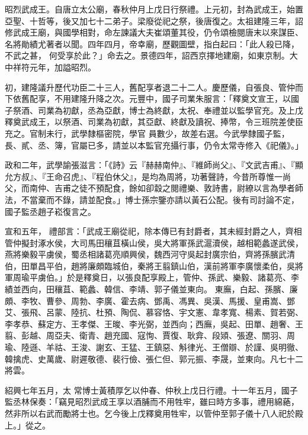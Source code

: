 \begin{pinyinscope}
 昭烈武成王。自唐立太公廟，春秋仲月上戊日行祭禮。上元初，封為武成王，始置亞聖、十哲等，後又加七十二弟子。梁廢從祀之祭，後唐復之。太祖建隆三年，詔修武成王廟，與國學相對，命左諫議大夫崔頌董其役，仍令頌檢閱唐末以來謀臣、名將勛績尤著者以聞。四年四月，帝幸廟，歷觀圖壁，指白起曰：「此人殺已降，不武之甚，
 何受享於此？」命去之。景德四年，詔西京擇地建廟，如東京制。大中祥符元年，加謚昭烈。



 初，建隆議升歷代功臣二十三人，舊配享者退二十二人。慶歷儀，自張良、管仲而下依舊配享，不用建隆升降之次。元豐中，國子司業朱服言：「釋奠文宣王，以國子祭酒、司業為初獻，丞為亞獻，博士為終獻，太祝、奉禮並以監學官充。及上戊釋奠武成王，以祭酒、司業為初獻，其亞獻、終獻及讀祝、捧幣，令三班院差使臣充之。官制未行，武學隸樞密院，學官
 員數少，故差右選。今武學隸國子監，長、貳、丞、簿，官屬已多，請並以本監官充攝行事，仍令太常寺修入《祀儀》。」



 政和二年，武學諭張滋言：「《詩》云『赫赫南仲』、『維師尚父』、『文武吉甫』、『顯允方叔』、『王命召虎』、『程伯休父』，是均為周將，功著聲詩，今昔所尊惟一尚父，而南仲、吉甫之徒不預配食，餘如卻縠之閱禮樂、敦詩書，尉繚以言為學者師法，不當棄而不錄，請並配食。」博士孫宗鑒亦請以黃石公配。後有司討論不定，國子監丞趙子崧復言之。



 宣和五年，
 禮部言：「武成王廟從祀，除本傳已有封爵者，其未經封爵之人，齊相管仲擬封涿水侯，大司馬田穰苴橫山侯，吳大將軍孫武滬瀆侯，越相範蠡遂武侯，燕將樂毅平虜侯，蜀丞相諸葛亮順興侯，魏西河守吳起封廣宗伯，齊將孫臏武清伯，田單昌平伯，趙將廉頗臨城伯，秦將王翦鎮山伯，漢前將軍李廣懷柔伯，吳將軍周瑜平虜伯。」於是釋奠日，以張良配享殿上，管仲、孫武、樂毅、諸葛亮、李績並西向，田穰苴、範蠡、韓信、李靖、郭子儀並東向。
 東廡，白起、孫臏、廉頗、李牧、曹參、周勃、李廣、霍去病、鄧禹、馮異、吳漢、馬援、皇甫嵩、鄧艾、張飛、呂蒙、陸抗、杜預、陶侃、慕容恪、宇文憲、韋孝寬、楊素、賀若弼、李孝恭、蘇定方、王孝傑、王晙、李光弼，並西向；西廡，吳起、田單、趙奢、王翦、彭越、周亞夫、衛青、趙充國、寇恂、賈復、耿弇、段熲、張遼、關羽、周瑜、陸遜、羊祜、王浚、謝玄、王猛、王鎮惡、斛律光、王僧辯、於謹、吳明徹、韓擒虎、史萬歲、尉遲敬德、裴行儉、張仁但、郭元振、李晟，並東向。凡七十二將雲。



 紹興七年五月，太
 常博士黃積厚乞以仲春、仲秋上戊日行禮。十一年五月，國子監丞林保奏：「竊見昭烈武成王享以酒脯而不用牲牢，雖曰時方多事，禮用綿蕝，然非所以右武而勵將士也。乞今後上戊釋奠用牲牢，以管仲至郭子儀十八人祀於殿上。」從之。




\end{pinyinscope}
